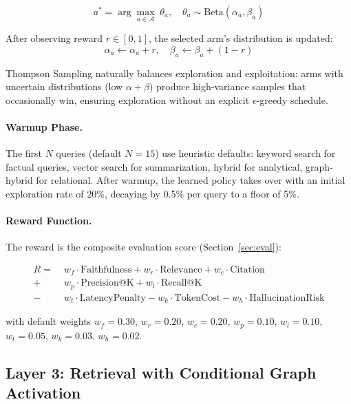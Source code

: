 \documentclass[11pt]{article}
\begin{document}
\begin{equation}
    a^* = \arg\max_{a \in \mathcal{A}} \; \theta_a, \quad \theta_a \sim \text{Beta}(\alpha_a, \beta_a)
\end{equation}

After observing reward $r \in [0,1]$, the selected arm's distribution is updated:
\begin{equation}
    \alpha_a \leftarrow \alpha_a + r, \quad \beta_a \leftarrow \beta_a + (1 - r)
\end{equation}

Thompson Sampling naturally balances exploration and exploitation: arms with uncertain distributions (low $\alpha + \beta$) produce high-variance samples that occasionally win, ensuring exploration without an explicit $\epsilon$-greedy schedule.

\paragraph{Warmup Phase.} The first $N$ queries (default $N=15$) use heuristic defaults: keyword search for factual queries, vector search for summarization, hybrid for analytical, graph-hybrid for relational. After warmup, the learned policy takes over with an initial exploration rate of 20\%, decaying by 0.5\% per query to a floor of 5\%.

\paragraph{Reward Function.} The reward is the composite evaluation score (Section~\ref{sec:eval}):

\begin{equation}
\label{eq:reward}
\begin{aligned}
R = \; &w_f \cdot \text{Faithfulness} + w_r \cdot \text{Relevance} + w_c \cdot \text{Citation} \\
      + &w_p \cdot \text{Precision@K} + w_l \cdot \text{Recall@K} \\
      - &w_t \cdot \text{LatencyPenalty} - w_k \cdot \text{TokenCost} - w_h \cdot \text{HallucinationRisk}
\end{aligned}
\end{equation}

with default weights $w_f{=}0.30$, $w_r{=}0.20$, $w_c{=}0.20$, $w_p{=}0.10$, $w_l{=}0.10$, $w_t{=}0.05$, $w_k{=}0.03$, $w_h{=}0.02$.

\subsection{Layer 3: Retrieval with Conditional Graph Activation}
\label{sec:graph}
\end{document}
